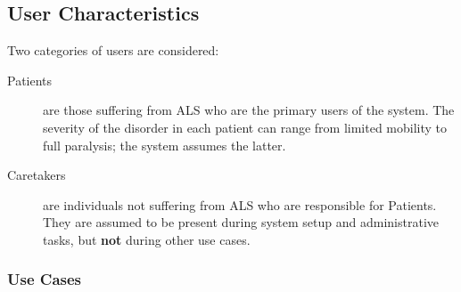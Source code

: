 \documentclass{article}
\begin{document}
\subsection{User Characteristics}

Two categories of users are considered:

\begin{description}
    \item[Patients] are those suffering from ALS who are the primary users of
        the system. The severity of the disorder in each patient can range
        from limited mobility to full paralysis; the system assumes the
        latter.
    \item[Caretakers] are individuals not suffering from ALS who are
        responsible for Patients. They are assumed to be present during system
        setup and administrative tasks, but \textbf{not} during other use
        cases.
\end{description}

\subsubsection{Use Cases}

\end{document}
